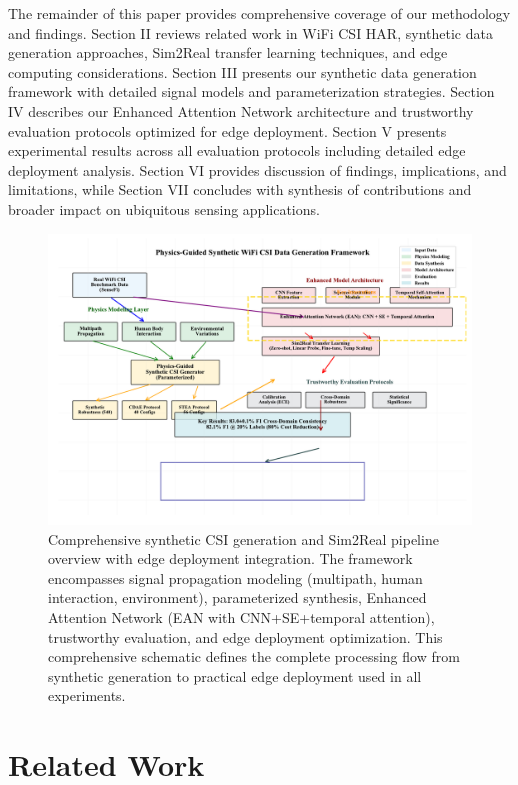 \documentclass[journal]{IEEEtran}
\begin{document}
The remainder of this paper provides comprehensive coverage of our methodology and findings. Section II reviews related work in WiFi CSI HAR, synthetic data generation approaches, Sim2Real transfer learning techniques, and edge computing considerations. Section III presents our synthetic data generation framework with detailed signal models and parameterization strategies. Section IV describes our Enhanced Attention Network architecture and trustworthy evaluation protocols optimized for edge deployment. Section V presents experimental results across all evaluation protocols including detailed edge deployment analysis. Section VI provides discussion of findings, implications, and limitations, while Section VII concludes with synthesis of contributions and broader impact on ubiquitous sensing applications.

\begin{figure}[t]
\centering
\includegraphics[width=\columnwidth]{plots/fig1_system_architecture_v1.pdf}
\caption{Comprehensive synthetic CSI generation and Sim2Real pipeline overview with edge deployment integration. The framework encompasses signal propagation modeling (multipath, human interaction, environment), parameterized synthesis, Enhanced Attention Network (EAN with CNN+SE+temporal attention), trustworthy evaluation, and edge deployment optimization. This comprehensive schematic defines the complete processing flow from synthetic generation to practical edge deployment used in all experiments.}
\label{fig:system_overview}
\end{figure}

\section{Related Work}
\end{document}
